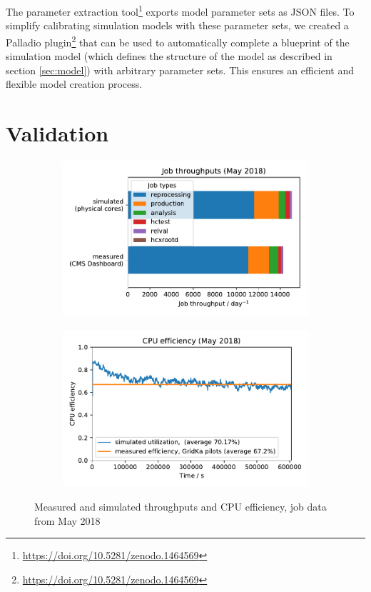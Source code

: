 \documentclass{webofc}
\newcommand{\footurl}[1]{\footnote{\url{#1}}}
\begin{document}
The parameter extraction tool\footurl{https://doi.org/10.5281/zenodo.1464569} exports model parameter sets as JSON files.
To simplify calibrating simulation models with these parameter sets, we created a Palladio plugin\footurl{https://doi.org/10.5281/zenodo.1464569} that can be used to automatically complete a blueprint of the simulation model (which defines the structure of the model as described in section \ref{sec:model}) with arbitrary parameter sets.
This ensures an efficient and flexible model creation process.

\section{Validation}
\label{validation}

\begin{figure}[h]
	\centering
	\vspace{-10px}
	\begin{subfigure}{0.48\linewidth}
		\includegraphics[width=\linewidth]{images/validation/throughputs}
	\end{subfigure}
	\begin{subfigure}{0.48\linewidth}
		\includegraphics[width=\linewidth]{images/validation/utilizations}
	\end{subfigure}
	\vspace{-10px}
	\caption{Measured and simulated throughputs and CPU efficiency, job data from May 2018}
	\label{fig:validation}
\end{figure}
\end{document}
